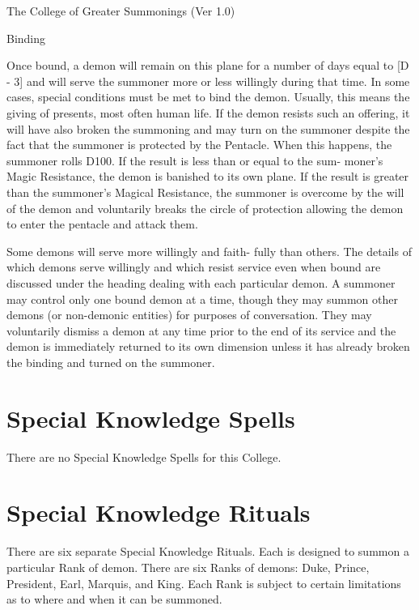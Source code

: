 \begin{Chapter}{The College of Greater Summonings (Ver 1.0)}
\begin{ritual}[Q-6]{Binding }
\begin{effects}
Once bound, a demon will remain on this plane for 
a number of days equal to [D - 3] and will serve the 
summoner more or  less willingly during that time. 
In  some  cases,  special  conditions  must  be  met  to 
bind  the  demon.  Usually,  this  means  the  giving  of 
presents,  most  often  human  life.  If  the  demon 
resists such an offering, it will have also broken the 
summoning and may turn on the summoner despite 
the  fact  that  the  summoner  is  protected  by  the 
Pentacle.  When  this  happens,  the  summoner  rolls 
D100. If the result is less than or equal to the sum-
moner’s  Magic  Resistance,  the  demon  is  banished 
to  its  own  plane.  If  the  result  is  greater  than  the 
summoner’s  Magical  Resistance,  the  summoner  is 
overcome by the will of the demon and voluntarily 
breaks the circle of protection allowing the demon 
to enter the pentacle and attack them. 

Some demons  will serve more  willingly and faith-
fully  than  others.  The  details  of  which  demons 
serve willingly and which resist service even when 
bound  are  discussed  under  the  heading  dealing 
with  each  particular  demon.  A  summoner  may 
control  only  one  bound  demon  at  a  time,  though 
they  may  summon  other  demons  (or  non-demonic 
entities)  for  purposes  of  conversation.  They  may 
voluntarily  dismiss  a  demon  at  any  time  prior  to 
the end of its service and the demon is immediately 
returned to its own dimension unless it has already 
broken the binding and turned on the summoner. 

\end{effects}
\end{ritual}

\section{Special Knowledge Spells}

There  are  no  Special  Knowledge  Spells  for  this 
College. 


\section{Special Knowledge Rituals}
There  are  six  separate  Special  Knowledge  Rituals. 
Each  is  designed  to  summon  a  particular  Rank  of 
demon.  There  are  six  Ranks  of  demons:  Duke, 
Prince,  President,  Earl,  Marquis,  and  King.  Each 
Rank  is  subject  to  certain  limitations  as  to  where 
and when it can be summoned. 



\end{Chapter}
